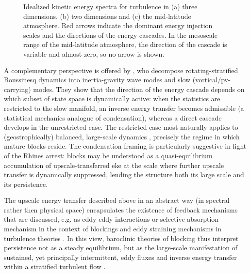 \begin{figure}[thpb]
    \centering
    
    \caption{Idealized kinetic energy spectra for turbulence in (a)
        three dimensions, (b) two dimensions and (c) the mid-latitude atmosphere.
        Red arrows indicate the dominant energy injection scales and the
        directions of the energy cascades. In the
        mesoscale range of the mid-latitude atmosphere, the direction of the
        cascade is variable and almost zero, so no arrow is shown.}
    \label{fig:energy_spectrum}
\end{figure}

A complementary perspective is offered by
\textcite{herbertRestrictedEquilibriumEnergy2014}, who decompose
rotating-stratified Boussinesq dynamics into inertia-gravity wave modes and
slow (vortical/\gls{pv}-carrying) modes. They show that the direction of the
energy cascade depends on which subset of state space is dynamically active:
when the statistics are restricted to the slow manifold, an inverse energy
transfer becomes admissible (a statistical mechanics analogue of
condensation), whereas a direct cascade develops in the unrestricted case.
The restricted case most naturally applies to (geostrophically) balanced,
large-scale dynamics \parencite{vautardInvariantManifoldsQuasigeostrophy1986},
precisely the regime in which mature blocks reside. The condensation framing
is particularly suggestive in light of the Rhines arrest: blocks may be
understood as a quasi-equilibrium accumulation of upscale-transferred \gls{eke}
at the scale where further upscale transfer is dynamically suppressed,
lending the structure both its large scale and its persistence.


The upscale energy transfer described above in an abstract way
(in spectral rather then physical space) encapsulates the existence of feedback
mechanisms that are discussed, e.g. as eddy-eddy interactions or selective
absorption mechanism in the context of blockings and
eddy straining mechanisms in
turbulence theories \parencite{ditlevsenTurbulenceShellModels2010}. In this
view, baroclinic theories of blocking thus interpret
persistence not as a steady equilibrium, but as the large-scale manifestation
of sustained, yet principally intermittent, eddy fluxes and inverse energy
transfer within a stratified turbulent flow
\parencite{hansenComparisonSpectralEnergy1984,
    jensenUsingEnstrophyAdvection2014,
    tanakaNumericalSimulationAmplification1991,
    fournierAtmosphericEnergeticsWavelet2003}.

